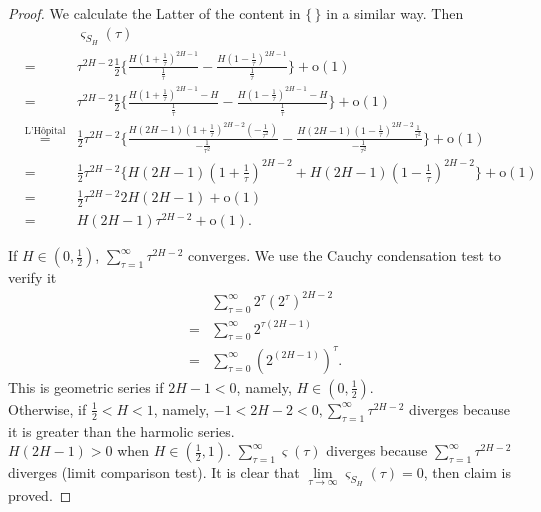 \documentclass[a4paper, twoside, 11pt]{article}
\theoremstyle{definition}
\begin{document}
\begin{proof}
	We calculate the Latter of the content in $\{\,\}$ in a similar way. Then
	\begin{eqnarray*}
	  &&\varsigma_{S_H}(\tau)\\
	&=& \tau^{2H-2} \frac{1}{2}\{ \frac{H(1 +\frac{1}{\tau})^{2H-1}}{\frac{1}{\tau}} - \frac{H(1-\frac{1}{\tau})^{2H-1}}{\frac{1}{\tau}}\}+ \mathrm{o}(1)\\
	&=& \tau^{2H-2} \frac{1}{2}\{ \frac{H(1 +\frac{1}{\tau})^{2H-1}- H}{\frac{1}{\tau}} - \frac{H(1-\frac{1}{\tau})^{2H-1} - H}{\frac{1}{\tau}}\}+ \mathrm{o}(1)\\
	&\overset{\text{L'H\^opital}}{=}& \frac{1}{2} \tau^{2H-2}\{\frac{H(2H-1)(1+\frac{1}{\tau})^{2H-2}(-\frac{1}{\tau^2})}{-\frac{1}{\tau^2}} - \frac{H(2H-1)(1-\frac{1}{\tau})^{2H-2}\frac{1}{\tau^2}}{-\frac{1}{\tau^2}}\}+ \mathrm{o}(1)\\
	&=& \frac{1}{2} \tau^{2H-2}\{H(2H-1)(1+\frac{1}{\tau})^{2H-2} + H(2H-1)(1-\frac{1}{\tau})^{2H-2}\}+ \mathrm{o}(1)\\
	&=& \frac{1}{2} \tau^{2H-2} 2H(2H-1)+ \mathrm{o}(1)\\
	&=& H(2H-1) \tau^{2H-2}+ \mathrm{o}(1).
	\end{eqnarray*}



	If $H \in (0, \frac{1}{2})$, $\sum\limits_{\tau=1}^{\infty} \tau^{2H-2}$ converges. We use the Cauchy condensation test to verify it
	 \begin{eqnarray*}
	&& \sum_{\tau=0}^{\infty} 2^{\tau} (2^\tau)^{2H-2} \\
	&=& \sum_{\tau=0}^{\infty} 2^{\tau(2H-1)}\\
	&=& \sum_{\tau=0}^{\infty} (2^{(2H-1)})^\tau.
	\end{eqnarray*}
	This is geometric series if $2H-1<0$, namely, $H\in(0,\frac{1}{2})$.  \\
	Otherwise, if $\frac{1}{2} < H < 1$, namely, $-1<2H-2<0, \sum\limits_{\tau=1}^{\infty} \tau^{2H-2} $ diverges because it is greater than the harmolic series.\\
	$H(2H-1) > 0$ when $H\in (\frac{1}{2}, 1)$. $\sum\limits_{\tau=1}^{\infty} \varsigma(\tau)$ diverges because $\sum\limits_{\tau=1}^{\infty} \tau^{2H-2} $ diverges (limit comparison test). It is clear that $\lim\limits_{\tau\rightarrow \infty}\varsigma_{S_H}(\tau)=0$, then claim is proved. 
	\end{proof}
\end{document}
